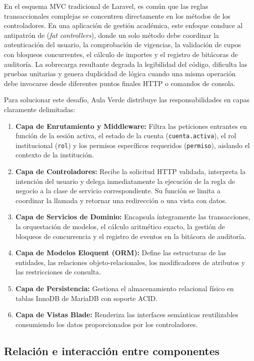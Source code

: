 En el esquema MVC tradicional de Laravel, es común que las reglas transaccionales complejas se concentren directamente en los métodos de los controladores. En una aplicación de gestión académica, este enfoque conduce al antipatrón de  (\textit{fat controllers}), donde un solo método debe coordinar la autenticación del usuario, la comprobación de vigencias, la validación de cupos con bloqueos concurrentes, el cálculo de importes y el registro de bitácoras de auditoría. La sobrecarga resultante degrada la legibilidad del código, dificulta las pruebas unitarias y genera duplicidad de lógica cuando una misma operación debe invocarse desde diferentes puntos finales HTTP o comandos de consola.

Para solucionar este desafío, Aula Verde distribuye las responsabilidades en capas claramente delimitadas:
\begin{enumerate}
    \item \textbf{Capa de Enrutamiento y Middleware:} Filtra las peticiones entrantes en función de la sesión activa, el estado de la cuenta (\texttt{cuenta.activa}), el rol institucional (\texttt{rol}) y los permisos específicos requeridos (\texttt{permiso}), aislando el contexto de la institución.
    \item \textbf{Capa de Controladores:} Recibe la solicitud HTTP validada, interpreta la intención del usuario y delega inmediatamente la ejecución de la regla de negocio a la clase de servicio correspondiente. Su función se limita a coordinar la llamada y retornar una redirección o una vista con datos.
    \item \textbf{Capa de Servicios de Dominio:} Encapsula íntegramente las transacciones, la orquestación de modelos, el cálculo aritmético exacto, la gestión de bloqueos de concurrencia y el registro de eventos en la bitácora de auditoría.
    \item \textbf{Capa de Modelos Eloquent (ORM):} Define las estructuras de las entidades, las relaciones objeto-relacionales, los modificadores de atributos y las restricciones de consulta.
    \item \textbf{Capa de Persistencia:} Gestiona el almacenamiento relacional físico en tablas InnoDB de MariaDB con soporte ACID.
    \item \textbf{Capa de Vistas Blade:} Renderiza las interfaces semánticas reutilizables consumiendo los datos proporcionados por los controladores.
\end{enumerate}

\subsection{Relación e interacción entre componentes}
\label{sec:interaccion_componentes}


